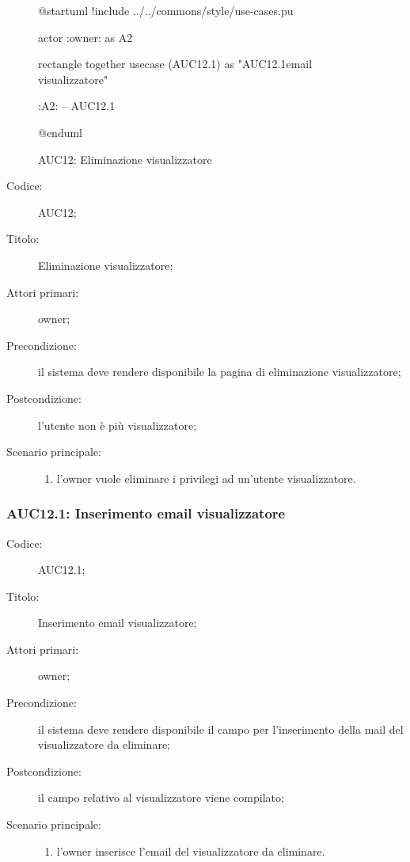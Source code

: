 \documentclass[../../../analisi-dei-requisiti.tex]{subfiles}
\begin{document}
\begin{figure}[H]
  \centering
  \begin{plantuml}
    @startuml
    !include ../../commons/style/use-cases.pu

    actor :owner: as A2

    rectangle {
        together {
            usecase (AUC12.1) as "AUC12.1\nInserimento email visualizzatore"
          }
      }

    :A2: -- AUC12.1

    @enduml
  \end{plantuml}
  \caption{AUC12: Eliminazione visualizzatore}%
  \label{fig:AUC12}
\end{figure}

\begin{description}
  \item[Codice:] AUC12;
  \item[Titolo:] Eliminazione visualizzatore;
  \item[Attori primari:] owner;
  \item[Precondizione:] il sistema deve rendere disponibile la pagina di eliminazione visualizzatore;
  \item[Postcondizione:] l'utente non è più visualizzatore;
  \item[Scenario principale:]
        \begin{enumerate}
          \item l'owner vuole eliminare i privilegi ad un'utente visualizzatore.
        \end{enumerate}
\end{description}

\subsubsection{AUC12.1: Inserimento email visualizzatore}%
\label{subs:AUC12.1}
\begin{description}
  \item[Codice:] AUC12.1;
  \item[Titolo:] Inserimento email visualizzatore;
  \item[Attori primari:] owner;
  \item[Precondizione:] il sistema deve rendere disponibile il campo per l'inserimento della mail del visualizzatore da eliminare;
  \item[Postcondizione:] il campo relativo al visualizzatore viene compilato;
  \item[Scenario principale:]
        \begin{enumerate}
          \item l'owner inserisce l'email del visualizzatore da eliminare.
        \end{enumerate}
\end{description}
\end{document}

